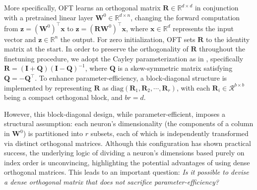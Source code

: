 More specifically, OFT learns an orthogonal matrix $\bm{R}\in\mathbb{R}^{d\times d}$ in conjunction with a pretrained linear layer $\bm{W}^0\in\mathbb{R}^{d\times n}$, changing the forward computation from $\bm{z}=(\bm{W}^0)^\top\bm{x}$ to $\bm{z}=(\bm{R}\bm{W}^0)^\top\bm{x}$, where $\bm{x}\in\mathbb{R}^{d}$ represents the input vector and $\bm{z}\in\mathbb{R}^{n}$ the output. For zero initialization, OFT sets $\bm{R}$ to the identity matrix at the start. In order to preserve the orthogonality of $\bm{R}$ throughout the finetuning procedure, we adopt the Cayley parameterization as in \cite{qiu2023controlling,liu2021orthogonal}, specifically $\bm{R}=(\bm{I}+\bm{Q})(\bm{I}-\bm{Q})^{-1}$, where $\bm{Q}$ is a skew-symmetric matrix satisfying $\bm{Q}=-\bm{Q}^\top$. To enhance parameter-efficiency, a block-diagonal structure is implemented by representing $\bm{R}$ as $\text{diag}(\bm{R}_1,\bm{R}_2,\cdots,\bm{R}_r)$, with each $\bm{R}_i\in\mathcal{R}^{b\times b}$ being a compact orthogonal block, and $br=d$. 

However, this block-diagonal design, while parameter-efficient, imposes a structural assumption: each neuron's dimensionality (the components of a column in $\bm{W}^0$) is partitioned into $r$ subsets, each of which is independently transformed via distinct orthogonal matrices. Although this configuration has shown practical success, the underlying logic of dividing a neuron's dimensions based purely on index order is unconvincing, highlighting the potential advantages of using dense orthogonal matrices. This leads to an important question: \emph{Is it possible to devise a dense orthogonal matrix that does not sacrifice parameter-efficiency?}


